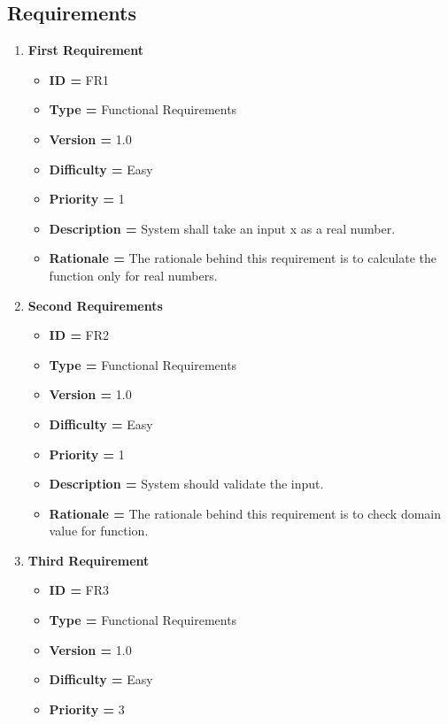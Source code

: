 \documentclass[a4paper,12pt]{article}
\begin{document}
    \subsection {Requirements}
        \begin{enumerate}
        \item\textbf{First Requirement}
        \begin{itemize}
            \item \textbf{ID = } FR1
            \item \textbf{Type = } Functional Requirements
            \item \textbf{Version = } 1.0
            \item \textbf{Difficulty = } Easy
            \item \textbf{Priority = } 1
            \item \textbf{Description = }	System shall take an input x as a  real number.
            \item \textbf{Rationale = }	The rationale behind this requirement is to calculate the function only for real numbers.
        \end{itemize}
        \item\textbf{Second Requirements}
        \begin{itemize}
            \item \textbf{ID = } FR2
            \item \textbf{Type = } Functional Requirements
            \item \textbf{Version = } 1.0
            \item \textbf{Difficulty = } Easy
            \item \textbf{Priority = } 1
            \item \textbf{Description = } System should validate the input.
            \item \textbf{Rationale = }	The rationale behind this requirement is to check domain value for function.
        \end{itemize}
        \item\textbf{Third Requirement}
        \begin{itemize}
            \item \textbf{ID = } FR3
            \item \textbf{Type = } Functional Requirements
            \item \textbf{Version = } 1.0
            \item \textbf{Difficulty = } Easy
            \item \textbf{Priority = } 3

\end{itemize}
\end{enumerate}
\end{document}

